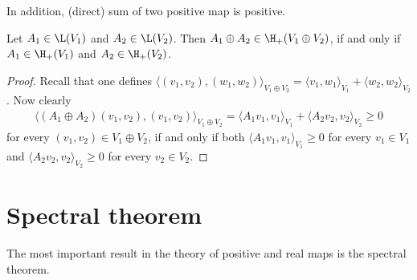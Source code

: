 In addition, (direct) sum of two positive map is positive.
\begin{lem}\label{direct_product}
	Let $A_{1} \in \L(V_{1})$ and $A_{2} \in \L(V_{2})$. Then $A_{1} \oplus A_{2} \in \H_{+}(V_{1} \oplus V_{2})$, if and only if $A_{1} \in \H_{+}(V_{1})$ and $A_{2} \in \H_{+}(V_{2})$.
\end{lem}
\begin{proof}
	Recall that one defines $\langle(v_{1}, v_{2}), (w_{1}, w_{2}) \rangle_{V_{1} \oplus V_{2}} = \langle v_{1}, w_{1} \rangle_{V_{1}} + \langle w_{2}, w_{2} \rangle_{V_{2}}$. Now clearly
	\begin{align*}
	\langle (A_{1} \oplus A_{2})(v_{1}, v_{2}), (v_{1}, v_{2}) \rangle_{V_{1} \oplus V_{2}} =  \langle A_{1} v_{1}, v_{1} \rangle_{V_{1}} + \langle A_{2} v_{2}, v_{2} \rangle_{V_{2}} \geq 0
	\end{align*}
	for every $(v_{1}, v_{2}) \in V_{1} \oplus V_{2}$, if and only if both $\langle A_{1} v_{1}, v_{1} \rangle_{V_{1}} \geq 0$ for every $v_{1} \in V_{1}$ and $\langle A_{2} v_{2}, v_{2} \rangle_{V_{2}} \geq 0$ for every $v_{2} \in V_{2}$.
\end{proof}

\section{Spectral theorem}

The most important result in the theory of positive and real maps is the spectral theorem.

